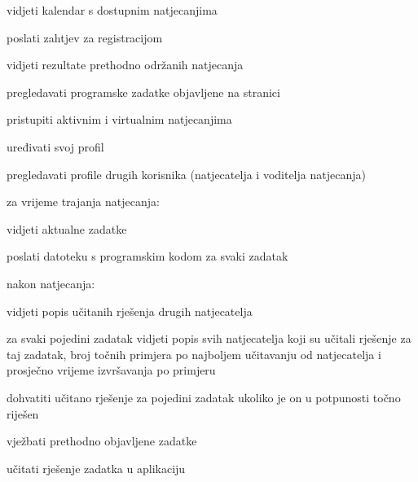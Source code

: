 \begin{packed_enum}
	\item  {}
	
	\begin{packed_enum}
		\item vidjeti kalendar s dostupnim natjecanjima
		\item poslati zahtjev za registracijom 
		\item vidjeti rezultate prethodno održanih natjecanja
		
	\end{packed_enum}
	
		\item  {}
	
	\begin{packed_enum}
		\item pregledavati programske zadatke objavljene na stranici
		\item pristupiti aktivnim i virtualnim natjecanjima
		\item uređivati svoj profil
		\item pregledavati profile drugih korisnika (natjecatelja i voditelja natjecanja)		
		\item za vrijeme trajanja natjecanja:
		\begin{packed_enum}
			\item vidjeti aktualne zadatke
			\item poslati datoteku s programskim kodom za svaki zadatak
		\end{packed_enum}
		\item nakon natjecanja:
		\begin{packed_enum}
			\item  vidjeti popis učitanih rješenja drugih natjecatelja
			\item za svaki pojedini zadatak vidjeti popis svih natjecatelja koji su učitali rješenje za taj zadatak, broj točnih primjera po najboljem učitavanju od natjecatelja i
			prosječno vrijeme izvršavanja po primjeru 
			\item dohvatiti učitano rješenje za pojedini zadatak ukoliko je on u potpunosti točno riješen
		\end{packed_enum}
		
		\item vježbati prethodno objavljene zadatke 
		\begin{packed_enum}
			\item učitati rješenje zadatka u aplikaciju
		\end{packed_enum}
		

\end{packed_enum}
\end{packed_enum}
